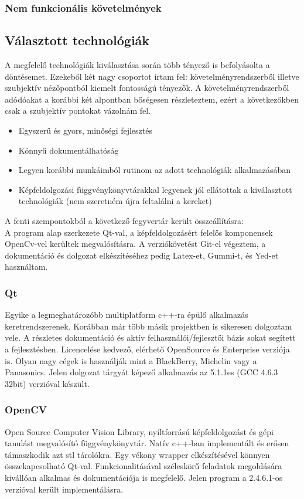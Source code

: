 \documentclass[a4paper,12pt,oneside]{report}
\begin{document}
\subsubsection{Nem funkcionális követelmények}


\subsection{Választott technológiák}
A megfelelő technológiák kiválasztása során több tényező is befolyásolta a döntésemet. Ezekeből két nagy csoportot írtam fel: követelményrendszerből illetve szubjektív nézőpontból kiemelt fontosságú tényezők. A követelményrendszerből adódóakat a korábbi két alpontban bőségesen részleteztem, ezért a következőkben csak a szubjektív pontokat vázolnám fel.
\begin{itemize}
	\itemsep0em
	\item Egyszerű és gyors, minőségi fejlesztés
	\item Könnyű dokumentálhatóság
	\item Legyen korábbi munkáimból rutinom az adott technológiák alkalmazásában
	\item Képfeldolgozási függvénykönyvtárakkal legyenek jól ellátottak a kiválasztott technológiák (nem szeretném újra feltalálni a kereket)

\end{itemize}
A fenti szempontokból a következő fegyvertár került összeállításra:\\ A program alap szerkezete Qt-val, a képfeldolgozásért felelős komponensek OpenCv-vel kerültek megvalósításra. A verziókövetést Git-el végeztem, a dokumentáció és dolgozat elkészítéséhez pedig Latex-et, Gummi-t, és Yed-et használtam.
\subsubsection{Qt}
Egyike a legmeghatározóbb multiplatform c++-ra épülő alkalmazás keretrendszerenek. \cite{website:qt_about} Korábban már több másik projektben is sikeresen dolgoztam vele. A részletes dokumentáció és aktív felhasználói/fejlesztői bázis sokat segített a fejlesztésben. \cite{website:qt_dochome} \cite{website:qt_docforum}\cite{website:qt_docmaillist} Licencelése kedvező, elérhető OpenSource és Enterprise verziója is. Olyan nagy cégek is használják mint a BlackBerry, Michelin vagy a Panasonics.\cite{website:qt_in_use}  Jelen dolgozat tárgyát képező alkalmazás az 5.1.1es (GCC 4.6.3 32bit) verzióval készült.

\subsubsection{OpenCV}	
Open Source Computer Vision Library, nyíltforrású képfeldolgozást és gépi tanulást megvalósító függvénykönyvtár. Natív c++-ban implementált és erősen támaszkodik azt stl tárolókra. Egy vékony wrapper elkészítésével könnyen összekapcsolható Qt-val. Funkcionalitásával széleskörű feladatok megoldására kivállóan alkalmas és dokumentációja is megfelelő. Jelen program a 2.4.6.1-os verzióval került implementálásra.
\end{document}
